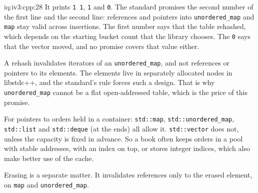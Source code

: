 \begin{solution}{iq:iv3:cpp:28}
It prints \texttt{1 1}, \texttt{1} and \texttt{0}. The standard promises the second number of the first line and the second line: references and pointers into \texttt{unordered\_map} and \texttt{map} stay valid across insertions. The first number says that the table rehashed, which depends on the starting bucket count that the library chooses. The \texttt{0} says that the vector moved, and no promise covers that value either.

A rehash invalidates iterators of an \texttt{unordered\_map}, and not references or pointers to its elements. The elements live in separately allocated nodes in libstdc++, and the standard's rule forces such a design. That is why \texttt{unordered\_map} cannot be a flat open-addressed table, which is the price of this promise.

For pointers to orders held in a container: \texttt{std::map}, \texttt{std::unordered\_map}, \texttt{std::list} and \texttt{std::deque} (at the ends) all allow it. \texttt{std::vector} does not, unless the capacity is fixed in advance. So a book often keeps orders in a pool with stable addresses, with an index on top, or stores integer indices, which also make better use of the cache.

Erasing is a separate matter. It invalidates references only to the erased element, on \texttt{map} and \texttt{unordered\_map}.

\end{solution}

